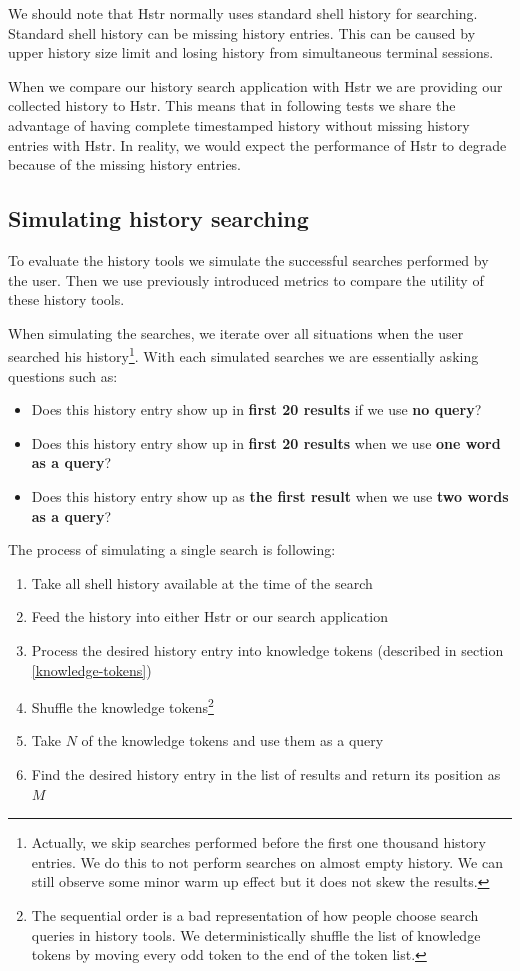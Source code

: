 We should note that Hstr normally uses standard shell history for searching. Standard shell history can be missing history entries. This can be caused by upper history size limit and losing history from simultaneous terminal sessions.

When we compare our history search application with Hstr we are providing our collected history to Hstr. This means that in following tests we share the advantage of having complete timestamped history without missing history entries with Hstr. In reality, we would expect the performance of Hstr to degrade because of the missing history entries.

\subsection{Simulating history searching}

To evaluate the history tools we simulate the successful searches performed by the user. Then we use previously introduced metrics to compare the utility of these history tools.

When simulating the searches, we iterate over all situations when the user searched his history\footnote{Actually, we skip searches performed before the first one thousand history entries. We do this to not perform searches on almost empty history. We can still observe some minor warm up effect but it does not skew the results.}. With each simulated searches we are essentially asking questions such as:

\begin{itemize}
    \item Does this history entry show up in \textbf{first 20 results} if we use \textbf{no query}?
    \item Does this history entry show up in \textbf{first 20 results} when we use \textbf{one word as a query}?
    \item Does this history entry show up as \textbf{the first result} when we use \textbf{two words as a query}?
\end{itemize}
The process of simulating a single search is following:

\begin{enumerate}
    \item Take all shell history available at the time of the search
    \item Feed the history into either Hstr or our search application
    \item Process the desired history entry into knowledge tokens (described in section \ref{knowledge-tokens})
    \item Shuffle the knowledge tokens\footnote{The sequential order is a bad representation of how people choose search queries in history tools. We deterministically shuffle the list of knowledge tokens by moving every odd token to the end of the token list.}
    \item Take \(N\) of the knowledge tokens and use them as a query
    \item Find the desired history entry in the list of results and return its position as \(M\)
\end{enumerate}

